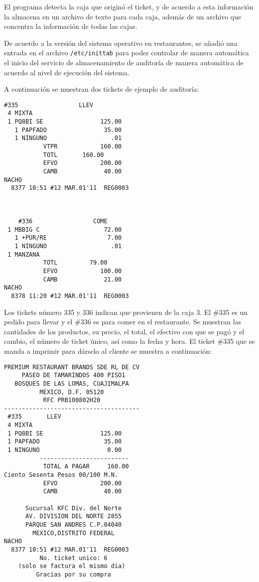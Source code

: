 El programa detecta la caja que originó el ticket, y de acuerdo a esta información la almacena en un archivo de texto para cada caja, además de un archivo que concentra la información de todas las cajas.

De acuerdo a la versión del sistema operativo en restaurantes, se añadió una entrada en el archivo \texttt{/etc/inittab} para poder controlar de manera automática el inicio del servicio de almacenamiento de auditoría de manera automática de acuerdo al nivel de ejecución del sistema. 

A continuación se muestran dos tickets de ejemplo de auditoría:

\begin{Verbatim}[fontsize=\small]
    #335                 LLEV  
 4 MIXTA   
 1 PQ8BI SE                125.00  
   1 PAPFADO                35.00  
   1 NINGUNO                  .01  
           VTPR            160.00  
           TOTL       160.00  
           EFVO            200.00  
           CAMB             40.00  
NACHO  
  8377 10:51 #12 MAR.01'11  REG0003  
 


    #336                 COME  
 1 MBBIG C                  72.00  
   1 +PUR/RE                 7.00  
   1 NINGUNO                  .01  
 1 MANZANA   
           TOTL         79.00  
           EFVO            100.00  
           CAMB             21.00  
NACHO  
  8378 11:20 #12 MAR.01'11  REG0003  
\end{Verbatim}

Los tickets número 335 y 336 indican que provienen de la caja 3. El \#335 es un pedido para llevar y el \#336 es para comer en el restaurante. Se muestran las cantidades de los productos, su precio, el total, el efectivo con que se pagó y el cambio, el número de ticket único, así como la fecha y hora. El ticket \#335 que se manda a imprimir para dárselo al cliente se muestra a continuación:

\begin{Verbatim}[fontsize=\small]
 PREMIUM RESTAURANT BRANDS SDE RL DE CV  
     PASEO DE TAMARINDOS 400 PISO1       
   BOSQUES DE LAS LOMAS, CUAJIMALPA      
          MEXICO, D.F. 05120             
           RFC PRB100802H20              
--------------------------------------   
 #335       LLEV  
 4 MIXTA   
 1 PQ8BI SE                125.00  
 1 PAPFADO                  35.00  
 1 NINGUNO                   0.00  
          -------------------------  
           TOTAL A PAGAR     160.00  
Ciento Sesenta Pesos 00/100 M.N.  
           EFVO            200.00  
           CAMB             40.00  
                                         
      Sucursal KFC Div. del Norte        
      AV. DIVISION DEL NORTE 2855        
      PARQUE SAN ANDRES C.P.04040        
        MEXICO,DISTRITO FEDERAL          
NACHO  
  8377 10:51 #12 MAR.01'11  REG0003  
          No. ticket unico: 6     
    (solo se factura el mismo dia)       
         Gracias por su compra           
\end{Verbatim}

